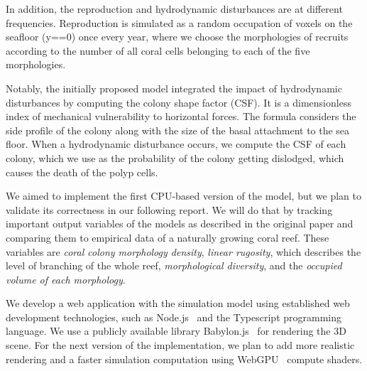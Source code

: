 \documentclass[9pt]{pnas-new}
\renewcommand{\etal}{et al.\ }
\begin{document}
In addition, the reproduction and hydrodynamic disturbances are at different frequencies. Reproduction is simulated as a random occupation of voxels on the seafloor (y==0) once every year, where we choose the morphologies of recruits according to the number of all coral cells belonging to each of the five morphologies.

Notably, the initially proposed model integrated the impact of hydrodynamic disturbances by computing the colony shape factor (CSF). It is a dimensionless index of mechanical vulnerability to horizontal forces. The formula considers the side profile of the colony along with the size of the basal attachment to the sea floor. When a hydrodynamic disturbance occurs, we compute the CSF of each colony, which we use as the probability of the colony getting dislodged, which causes the death of the polyp cells.

We aimed to implement the first CPU-based version of the model, but we plan to validate its correctness in our following report. We will do that by tracking important output variables of the models as described in the original paper and comparing them to empirical data of a naturally growing coral reef. These variables are \textit{coral colony morphology density}, \textit{linear rugosity}, which describes the level of branching of the whole reef, \textit{morphological diversity}, and the \textit{occupied volume of each morphology}. 

We develop a web application with the simulation model using established web development technologies, such as Node.js~\cite{nodejs} and the Typescript programming language. We use a publicly available library Babylon.js~\cite{babylonjs} for rendering the 3D scene. For the next version of the implementation, we plan to add more realistic rendering and a faster simulation computation using WebGPU~\cite{webgpu} compute shaders.

\end{document}
